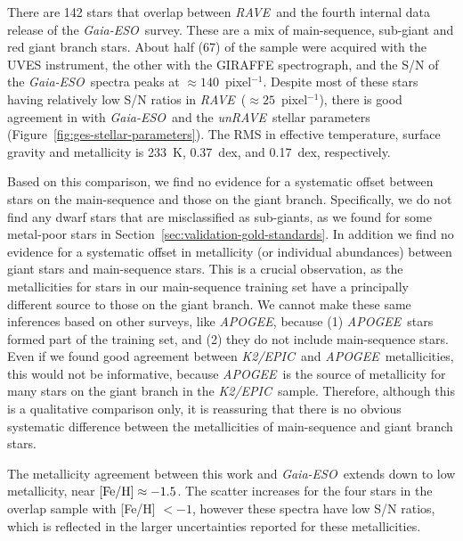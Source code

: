 \documentclass[preprint,trackchanges]{aastex}
\newcommand{\acronym}[1]{{\small{#1}}}
\newcommand{\project}[1]{\textsl{#1}}
\newcommand{\rave}{\project{\acronym{RAVE}}}
\newcommand{\ges}{\project{Gaia-ESO}}
\newcommand{\apogee}{\project{\acronym{APOGEE}}}
\newcommand{\epic}{\project{K2/EPIC}}
\newcommand{\unrave}{\project{unRAVE}}
\begin{document}
There are 142 stars that overlap between \rave\ and the fourth internal
data release of the \ges\ survey. These are a mix of main-sequence, 
sub-giant and red giant branch stars.  About half (67) of the sample 
were acquired with the \acronym{UVES} instrument, the other with the \acronym{GIRAFFE} spectrograph, and
the S/N of the \ges\ spectra peaks at $\approx140$~pixel$^{-1}$.  Despite 
most of these stars having
relatively low S/N ratios in \rave\ ($\approx 25$~pixel$^{-1}$), there is good 
agreement in with \ges\ and the \unrave\ stellar parameters (Figure~\ref{fig:ges-stellar-parameters}).  
The RMS in effective temperature, surface gravity and metallicity is
233~K, 0.37~dex, and 0.17~dex, respectively.  



Based on this comparison, we find no evidence for a systematic offset 
between stars on the main-sequence and those on the giant branch. Specifically,
we do not find any dwarf stars that are misclassified as sub-giants, as we
found for some metal-poor stars in Section~\ref{sec:validation-gold-standards}.
In addition we find no evidence for a systematic offset in metallicity (or
individual abundances) between giant stars and main-sequence stars.  This is
a crucial observation, as the metallicities for stars in our main-sequence
training set have a principally different source to those on the giant branch.
We cannot make these same inferences based on other surveys, like \apogee,
because (1) \apogee\ stars formed part of the training set, and (2) they do
not include main-sequence stars.  Even if we found good agreement between
\epic\ and \apogee\ metallicities, this would not be informative, because
\apogee\ is the source of metallicity for many stars on the giant branch in
the \epic\ sample. Therefore, although this is a qualitative comparison only,
it is reassuring that there is no obvious systematic difference between the
metallicities of main-sequence and giant branch stars.


The metallicity agreement between this work and \ges\ extends down to low
metallicity, near $[{\rm Fe/H}] \approx -1.5$.  The scatter increases for
the four stars in the overlap sample with [Fe/H] $< -1$, however these
spectra have low S/N ratios, which is reflected in the larger uncertainties
reported for these metallicities. 
\end{document}
